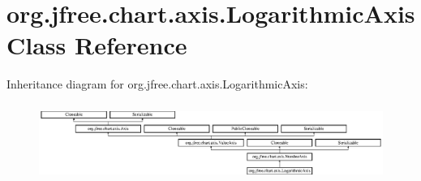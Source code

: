 \hypertarget{classorg_1_1jfree_1_1chart_1_1axis_1_1_logarithmic_axis}{}\section{org.\+jfree.\+chart.\+axis.\+Logarithmic\+Axis Class Reference}
\label{classorg_1_1jfree_1_1chart_1_1axis_1_1_logarithmic_axis}
Inheritance diagram for org.\+jfree.\+chart.\+axis.\+Logarithmic\+Axis\+:\begin{figure}[H]
\begin{center}
\leavevmode
\includegraphics[height=2.533937cm]{classorg_1_1jfree_1_1chart_1_1axis_1_1_logarithmic_axis}
\end{center}
\end{figure}
